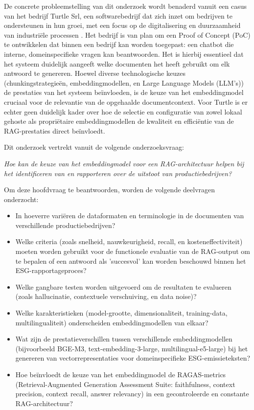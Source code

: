 De concrete probleemstelling van dit onderzoek wordt benaderd vanuit een casus van het bedrijf Turtle Srl, een softwarebedrijf dat zich inzet om bedrijven te ondersteunen in hun groei, met een focus op de digitalisering en duurzaamheid van industri\"ele processen \autocite{TurtleSrl2023}.
Het bedrijf is van plan om een Proof of Concept (PoC) te ontwikkelen dat binnen een bedrijf kan worden toegepast: een chatbot die interne, domeinspecifieke vragen kan beantwoorden. Het is hierbij essentieel dat het systeem duidelijk aangeeft welke documenten het heeft gebruikt om elk antwoord te genereren.
Hoewel diverse technologische keuzes (chunkingstrategie\"en, embeddingmodellen, en Large Language Models (LLM's)) de prestaties van het systeem beïnvloeden, is de keuze van het embeddingmodel cruciaal voor de relevantie van de opgehaalde documentcontext. Voor Turtle is er echter geen duidelijk kader over hoe de selectie en configuratie van zowel lokaal gehoste als propri\"etaire embeddingmodellen de kwaliteit en effici\"entie van de RAG-prestaties direct beïnvloedt.


Dit onderzoek vertrekt vanuit de volgende onderzoeksvraag:

\textit{Hoe kan de keuze van het embeddingmodel voor een RAG-architectuur helpen bij het identificeren van en rapporteren over de uitstoot van productiebedrijven?}

Om deze hoofdvraag te beantwoorden, worden de volgende deelvragen onderzocht:

\begin{itemize}
  \item In hoeverre vari\"{e}ren de dataformaten en terminologie in de documenten van verschillende productiebedrijven?
  \item Welke criteria (zoals snelheid, nauwkeurigheid, recall, en kosteneffectiviteit) moeten worden gebruikt voor de functionele evaluatie van de RAG-output om te bepalen of een antwoord als 'succesvol' kan worden beschouwd binnen het ESG-rapportageproces?
  \item Welke gangbare testen worden uitgevoerd om de resultaten te evalueren (zoals hallucinatie, contextuele verschuiving, en data noise)?
  \item Welke karakteristieken (model-grootte, dimensionaliteit, training-data, multilingualiteit) onderscheiden embeddingmodellen van elkaar?
  \item Wat zijn de prestatieverschillen tussen verschillende embeddingmodellen (bijvoorbeeld BGE-M3, text-embedding-3-large, multilingual-e5-large) bij het genereren van vectorrepresentaties voor domeinspecifieke ESG-emissieteksten?
  \item Hoe beïnvloedt de keuze van het embeddingmodel de RAGAS-metrics (Retrieval-Augmented Generation Assessment Suite: faithfulness, context precision, context recall, answer relevancy) in een gecontroleerde en constante RAG-architectuur?
\end{itemize}

